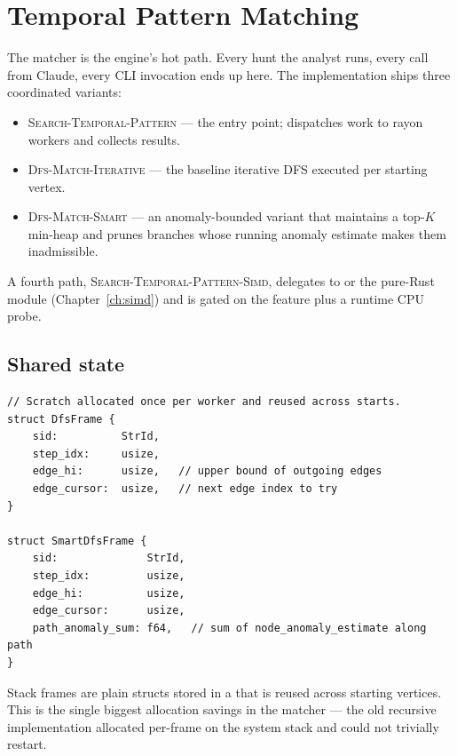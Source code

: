 \chapter{Temporal Pattern Matching}
\label{ch:matcher}

The matcher is the engine's hot path. Every hunt the analyst runs,
every  call from Claude, every CLI invocation ends
up here. The implementation ships three coordinated variants:

\begin{itemize}
    \item \textsc{Search-Temporal-Pattern} --- the entry point;
        dispatches work to rayon workers and collects results.
    \item \textsc{Dfs-Match-Iterative} --- the baseline iterative
        DFS executed per starting vertex.
    \item \textsc{Dfs-Match-Smart} --- an anomaly-bounded variant
        that maintains a top-$K$ min-heap and prunes branches
        whose running anomaly estimate makes them inadmissible.
\end{itemize}

A fourth path, \textsc{Search-Temporal-Pattern-Simd}, delegates to
 or the pure-Rust  module
(Chapter~\ref{ch:simd}) and is gated on the  feature
plus a runtime CPU probe.

\section{Shared state}

\begin{lstlisting}[style=rust]
// Scratch allocated once per worker and reused across starts.
struct DfsFrame {
    sid:          StrId,
    step_idx:     usize,
    edge_hi:      usize,   // upper bound of outgoing edges
    edge_cursor:  usize,   // next edge index to try
}

struct SmartDfsFrame {
    sid:              StrId,
    step_idx:         usize,
    edge_hi:          usize,
    edge_cursor:      usize,
    path_anomaly_sum: f64,   // sum of node_anomaly_estimate along path
}
\end{lstlisting}

Stack frames are plain structs stored in a  that is
reused across starting vertices. This is the single biggest
allocation savings in the matcher --- the old recursive
implementation allocated per-frame on the system stack and could
not trivially restart.

